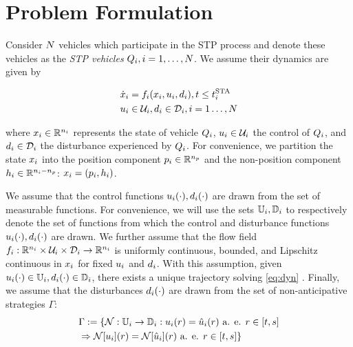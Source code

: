 \section{Problem Formulation \label{sec:formulation}}
Consider $N$ vehicles which participate in the STP process and denote these vehicles as the \textit{STP vehicles} $Q_i, i = 1, \ldots, N$. We assume their dynamics are given by

\begin{equation}
\label{eq:dyn}
\begin{aligned}
\dot\state_i &= \fdyn_i(\state_i, \ctrl_i, \dstb_i), t \le \sta_i \\
\ctrl_i &\in \cset_i, \dstb_i \in \dset_i, i = 1 \ldots, \N
\end{aligned}
\end{equation}

\noindent where $x_i \in \mathbb{R}^{n_i}$ represents the state of vehicle $Q_i$, $u_i \in \mathcal{U}_i$ the control of $Q_i$, and $d_i \in \mathcal{D}_i$ the disturbance experienced by $Q_i$. For convenience, we partition the state $x_i$ into the position component $p_i \in \mathbb{R}^{n_p}$ and the non-position component $h_i \in \mathbb{R}^{n_i - n_p}$: $x_i = (p_i, h_i)$.

We assume that the control functions $u_i(\cdot), d_i(\cdot)$ are drawn from the set of measurable functions. 
For convenience, we will use the sets $\mathbb{U}_i, \mathbb{D}_i$ to respectively denote the set of functions from which the control and disturbance functions $u_i(\cdot), d_i(\cdot)$ are drawn. 
We further assume that the flow field $f_i: \mathbb{R}^{n_i}\times\mathcal{U}_i\times\mathcal{D}_i \rightarrow \mathbb{R}^{n_i}$ is uniformly continuous, bounded, and Lipschitz continuous in $x_i$ for fixed $u_i$ and $d_i$. With this assumption, given $u_i(\cdot) \in \mathbb{U}_i, d_i(\cdot) \in \mathbb{D}_i$, there exists a unique trajectory solving \eqref{eq:dyn} \cite{EarlA.Coddington1955}. 
Finally, we assume that the disturbances $d_i(\cdot)$ are drawn from the set of non-anticipative strategies \cite{Mitchell05} $\Gamma$:
\begin{equation}
\begin{aligned}
& \Gamma := \{\mathcal{N}: \mathbb{U}_i \rightarrow \mathbb{D}_i:  u_i(r) = \hat{u}_i(r) \text{ a. e. } r\in[t,s] \\
& \Rightarrow \mathcal{N}[u_i](r) = \mathcal{N}[\hat{u}_i](r) \text{ a. e. } r\in[t,s]\}
\end{aligned}
\end{equation}

